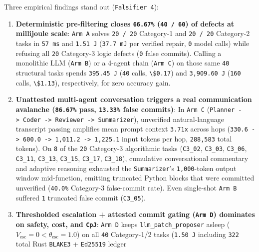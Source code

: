 \documentclass[10pt,letterpaper]{article}
\providecommand{\tightlist}{\setlength{\itemsep}{1pt}\setlength{\parskip}{0pt}}
\begin{document}
Three empirical findings stand out (\texttt{Falsifier\ 4}):

\begin{enumerate}
\def\labelenumi{\arabic{enumi}.}
\tightlist
\item
  \textbf{Deterministic pre-filtering closes \texttt{66.67\%}
  (\texttt{40\ /\ 60}) of defects at millijoule scale}: \texttt{Arm\ A}
  solves \texttt{20\ /\ 20} Category-1 and \texttt{20\ /\ 20} Category-2
  tasks in \texttt{57\ ms} and \texttt{1.51\ J} (\texttt{37.7\ mJ} per
  verified repair, \texttt{0} model calls) while refusing all
  \texttt{20} Category-3 logic defects (\texttt{0} false commits).
  Calling a monolithic LLM (\texttt{Arm\ B}) or a 4-agent chain
  (\texttt{Arm\ C}) on those same \texttt{40} structural tasks spends
  \texttt{395.45\ J} (\texttt{40} calls,
  \texttt{\textbackslash{}\$0.17}) and \texttt{3,\allowbreak{}909.\allowbreak{}60\ J}
  (\texttt{160} calls, \texttt{\textbackslash{}\$1.13}), respectively,
  for zero accuracy gain.
\item
  \textbf{Unattested multi-agent conversation triggers a real
  communication avalanche (\texttt{86.67\%} pass, \texttt{13.33\%} false
  commits)}: In \texttt{Arm\ C}
  (\texttt{Planner\ -\textgreater{}\ Coder\ -\textgreater{}\ Reviewer\ -\textgreater{}\ Summarizer}),
  unverified natural-language transcript passing amplifies mean prompt
  context \texttt{3.71x} across hops
  (\texttt{330.6\ -\textgreater{}\ 600.0\ -\textgreater{}\ 1,011.2\ -\textgreater{}\ 1,225.1}
  input tokens per hop, \texttt{288,583} total tokens). On \texttt{8} of
  the \texttt{20} Category-3 algorithmic tasks (\texttt{C3\_02},
  \texttt{C3\_03}, \texttt{C3\_06}, \texttt{C3\_11}, \texttt{C3\_13},
  \texttt{C3\_15}, \texttt{C3\_17}, \texttt{C3\_18}), cumulative
  conversational commentary and adaptive reasoning exhausted the
  \texttt{Summarizer}'s \texttt{1,000}-token output window mid-function,
  emitting truncated Python blocks that were committed unverified
  (\texttt{40.0\%} Category-3 false-commit rate). Even single-shot
  \texttt{Arm\ B} suffered \texttt{1} truncated false commit
  (\texttt{C3\_05}).
\item
  \textbf{Thresholded escalation + attested commit gating
  (\texttt{Arm\ D}) dominates on safety, cost, and \texttt{CpJ}}:
  \texttt{Arm\ D} keeps \texttt{llm\_\allowbreak{}patch\_\allowbreak{}proposer} asleep
  (\(V_{\text{esc}} = 0 < \theta_{\text{esc}} = 1.0\)) on all
  \texttt{40} Category-1/2 tasks (\texttt{1.50\ J} including
  \texttt{322} total Rust \texttt{BLAKE3} + \texttt{Ed25519} ledger

\end{enumerate}
\end{document}
